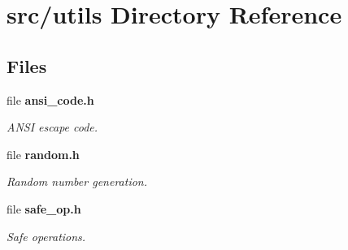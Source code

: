 \section{src/utils Directory Reference}
\label{dir_313caf1132e152dd9b58bea13a4052ca}
\subsection*{Files}
\begin{DoxyCompactItemize}
\item 
file \textbf{ ansi\+\_\+code.\+h}
\begin{DoxyCompactList}\small\item\em A\+N\+SI escape code. \end{DoxyCompactList}\item 
file \textbf{ random.\+h}
\begin{DoxyCompactList}\small\item\em Random number generation. \end{DoxyCompactList}\item 
file \textbf{ safe\+\_\+op.\+h}
\begin{DoxyCompactList}\small\item\em Safe operations. \end{DoxyCompactList}\end{DoxyCompactItemize}
